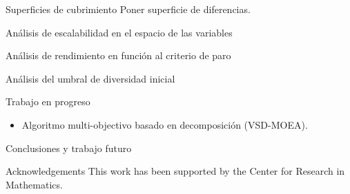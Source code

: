\documentclass{beamer}
\begin{document}
\begin{frame}{Superficies de cubrimiento}
Poner superficie de diferencias.
\end{frame}

\begin{frame}{Análisis de escalabilidad en el espacio de las variables}
\end{frame}

\begin{frame}{Análisis de rendimiento en función al criterio de paro}
\end{frame}


\begin{frame}{Análisis del umbral de diversidad inicial}
\end{frame}


\begin{frame}{Trabajo en progreso}
\begin{itemize}
    \item Algoritmo multi-objectivo basado en decomposición (VSD-MOEA).
\end{itemize}
\end{frame}


\begin{frame}{Conclusiones y trabajo futuro}


\end{frame}




\begin{frame}{Acknowledgements}
This work has been supported by the Center for Research in Mathematics.
\end{frame}
\end{document}
